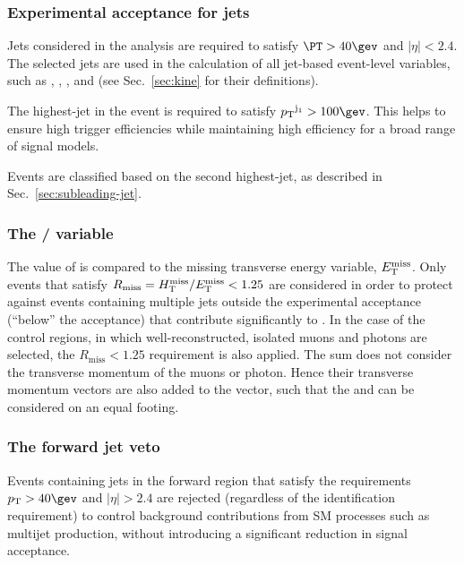 \subsubsection{Experimental acceptance for jets}
\label{sec:jetsacc}

Jets considered in the analysis are required to satisfy $\PT > 40\gev$
and $|\eta| < 2.4$. The selected jets are used in the calculation of
all jet-based event-level variables, such as \njet, \HT, \mht, and
\alphat (see Sec.~\ref{sec:kine} for their definitions).

The highest-\Pt jet in the event is required to satisfy $\Pt^{\mathrm
  j_1} > 100\gev$. This helps to ensure high trigger efficiencies
while maintaining high efficiency for a broad range of signal models.

Events are classified based on the second highest-\Pt jet, as
described in Sec.~\ref{sec:subleading-jet}.

\subsubsection{The \texorpdfstring{\mht/\met}{HTmiss/ETmiss} variable} 
\label{sec:mhtmet}

The value of \mht is compared to the missing transverse energy
variable, $\mbox{$E_\text{T}^{\rm miss}$}$. Only events that satisfy
$R_{\mathrm{miss}}=\mbox{$H_{\rm T}^{\rm miss}$}/\mbox{$E_\text{T}^{\rm miss}$} < 1.25$ are considered in order to
protect against events containing multiple jets outside the
experimental acceptance (\eg ``below'' the \Pt acceptance) that
contribute significantly to \mht. In the case of the control regions,
in which well-reconstructed, isolated muons and photons are selected,
the $R_{\mathrm{miss}} < 1.25$ requirement is also applied. The \mht
sum does not consider the transverse momentum of the muons or
photon. Hence their transverse momentum vectors are also added to the
\met vector, such that the \mht and \met can be considered on an equal
footing.

\subsubsection{The forward jet veto} 

Events containing jets in the forward region that satisfy the
requirements $\Pt > 40\gev$ and $|\eta|>2.4$ are rejected (regardless
of the identification requirement) to control background contributions
from SM processes such as multijet production, without introducing a
significant reduction in signal acceptance.

